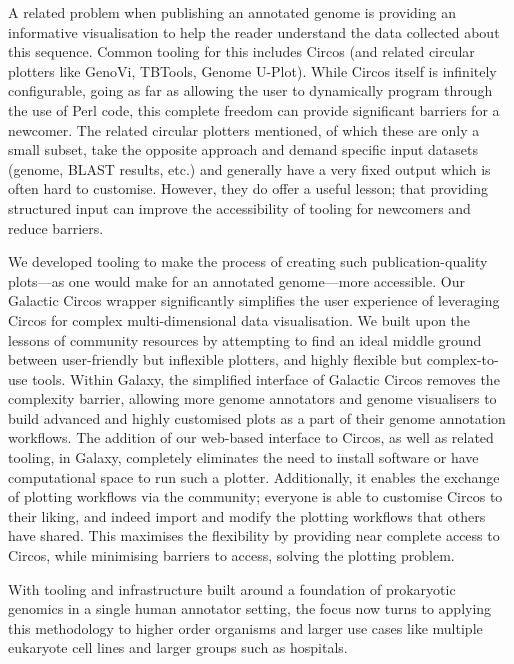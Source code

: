 A related problem when publishing an annotated genome is providing an informative visualisation to help the reader understand the data collected about this sequence. Common tooling for this includes Circos\cite{Krzywinski_2009} (and related circular plotters like GenoVi\cite{Cumsille_2023}, TBTools\cite{Chen_2022}, Genome U-Plot\cite{Gaitatzes_2017}). While Circos itself is infinitely configurable, going as far as allowing the user to dynamically program through the use of Perl\cite{wall1994perl} code, this complete freedom can provide significant barriers for a newcomer. The related circular plotters mentioned, of which these are only a small subset, take the opposite approach and demand specific input datasets (genome, BLAST results, etc.) and generally have a very fixed output which is often hard to customise. However, they do offer a useful lesson; that providing structured input can improve the accessibility of tooling for newcomers and reduce barriers.

We developed tooling to make the process of creating such publication-quality plots---as one would make for an annotated genome---more accessible. Our Galactic Circos wrapper significantly simplifies the user experience of leveraging Circos for complex multi-dimensional data visualisation. We built upon the lessons of community resources by attempting to find an ideal middle ground between user-friendly but inflexible plotters, and highly flexible but complex-to-use tools. Within Galaxy, the simplified interface of Galactic Circos removes the complexity barrier, allowing more genome annotators and genome visualisers to build advanced and highly customised plots as a part of their genome annotation workflows. The addition of our web-based interface to Circos, as well as related tooling, in Galaxy, completely eliminates the need to install software or have computational space to run such a plotter. Additionally, it enables the exchange of plotting workflows via the community; everyone is able to customise Circos to their liking, and indeed import and modify the plotting workflows that others have shared. This maximises the flexibility by providing near complete access to Circos, while minimising barriers to access, solving the plotting problem.

With tooling and infrastructure built around a foundation of prokaryotic genomics in a single human annotator setting, the focus now turns to applying this methodology to higher order organisms and larger use cases like multiple eukaryote cell lines and larger groups such as hospitals.

